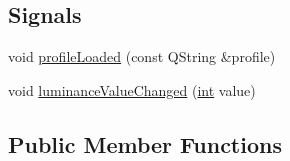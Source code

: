 \subsection*{Signals}
\begin{DoxyCompactItemize}
\item 
void \mbox{\hyperlink{class_q_g_b_a_1_1_input_controller_aa71a637cb3965c09bde7ac6e2b562365}{profile\+Loaded}} (const Q\+String \&profile)
\item 
void \mbox{\hyperlink{class_q_g_b_a_1_1_input_controller_aa8fd0c128275fb3ec80e51d770770000}{luminance\+Value\+Changed}} (\mbox{\hyperlink{ioapi_8h_a787fa3cf048117ba7123753c1e74fcd6}{int}} value)
\end{DoxyCompactItemize}
\subsection*{Public Member Functions}
